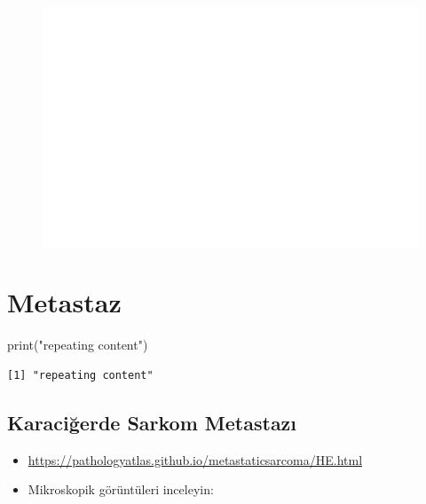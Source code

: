 \documentclass[
  letterpaper,
  DIV=11,
  numbers=noendperiod]{scrreprt}
\newenvironment{Shaded}{}{}
\newcommand{\FunctionTok}[1]{\textcolor[rgb]{0.02,0.16,0.49}{#1}}
\newcommand{\NormalTok}[1]{#1}
\newcommand{\StringTok}[1]{\textcolor[rgb]{0.25,0.44,0.63}{#1}}
\begin{document}
\begin{figure}[H]

{\centering 

\href{https://pathologyatlas.github.io/ectopic-adrenal/HE.html}{\includegraphics{./heterotopi_files/figure-pdf/unnamed-chunk-5-1.pdf}}

}

\end{figure}

\hypertarget{metastaz}{%
\chapter{Metastaz}\label{metastaz}}

\begin{Shaded}
\begin{Highlighting}[]
\FunctionTok{print}\NormalTok{(}\StringTok{"repeating content"}\NormalTok{)}
\end{Highlighting}
\end{Shaded}

\begin{verbatim}
[1] "repeating content"
\end{verbatim}

\hypertarget{karaciux11ferde-sarkom-metastazux131}{%
\section{Karaciğerde Sarkom
Metastazı}\label{karaciux11ferde-sarkom-metastazux131}}

\begin{itemize}
\item
  \url{https://pathologyatlas.github.io/metastaticsarcoma/HE.html}
\item
  Mikroskopik görüntüleri inceleyin:
\end{itemize}
\end{document}
